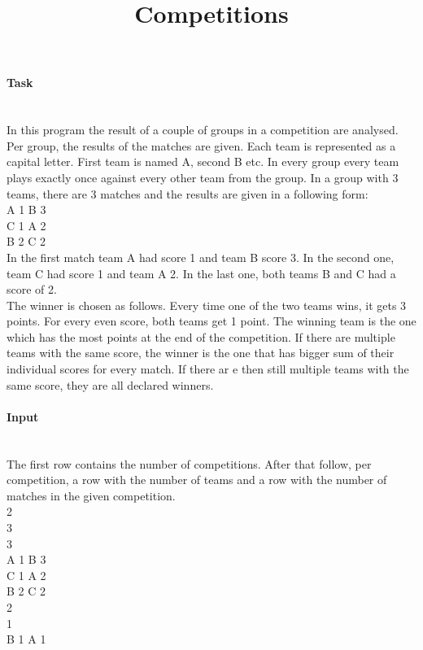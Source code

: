 \documentclass[10pt,a4paper]{article}
\begin{document}
\title{Competitions}
\maketitle

\paragraph{Task\\ \\}

In this program the result of a couple of groups in a competition are analysed. Per group, the results of the matches are given. Each team is represented as a capital letter. First team is named A, second B etc. In every group every team plays exactly once against every other team from the group. In a group with 3 teams, there are 3 matches and the results are given in a following form: \\
A 1 B 3 \\
C 1 A 2 \\
B 2 C 2 \\

In the first match team A had score 1 and team B score 3. In the second one, team C had score 1 and team A 2. In the last one, both teams B and C had a score of 2. \\

The winner is chosen as follows. Every time one of the two teams wins, it gets 3 points. For every even score, both teams get 1 point. The winning team is the one which has the most points at the end of the competition. If there are multiple teams with the same score, the winner is the one that has bigger sum of their individual scores for every match. If there ar e then still multiple teams with the same score, they are all declared winners.

\paragraph{Input\\ \\}

The first row contains the number of competitions. After that follow, per competition, a row with the number of teams and a row with the number of matches in the given competition. \\
2 \\3 \\3 \\A 1 B 3 \\C 1 A 2 \\ B 2 C 2\\ 2\\ 1\\ B 1 A 1 \\
\end{document}
